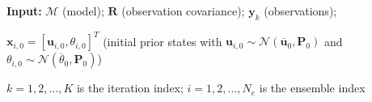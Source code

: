 \begin{algorithm}[!ht]
    \caption{Scheme of the EnKF used in the present analyses for parameter optimization.}
    \label{alg:EnKF}
    \begin{algorithmic}[1]
        \State \textbf{Input:} $\mathcal{M}$ (model); $\boldsymbol{R}$ (observation covariance); $\boldsymbol{y}_k$ (observations);

        $\boldsymbol{x}_{i,0} = [\boldsymbol{u}_{i,0}, \theta_{i,0}]^T$ (initial prior states with $\boldsymbol{u}_{i,0} \sim \mathcal{N}(\boldsymbol{\overline{u}}_0, \boldsymbol{P}_0)$ and $\theta_{i,0} \sim \mathcal{N}(\overline{\theta}_0, \boldsymbol{P}_0)$)

        $k = 1, 2, ..., K$ is the iteration index; $i = 1, 2, ..., N_e$ is the ensemble index


\end{algorithmic}
\end{algorithm}
